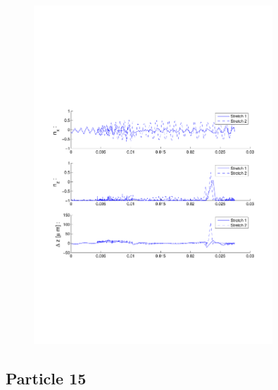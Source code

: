 \begin{figure}[H]

\centering

\includegraphics[width=0.8\textwidth]{Images/Particle 12/Stretch1.pdf}

\end{figure}


\subsection{Particle 15}

